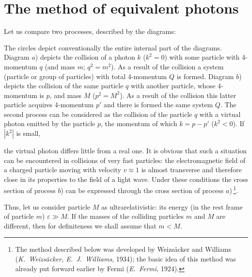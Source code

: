 
\section{The method of equivalent photons}


Let us compare two processes, described by the diagrams:


The circles depict conventionally the entire internal part of the diagrams. Diagram $a$) depicts the collision of a photon $k$ ($k^2 = 0$) with some particle with 4-momentum $q$ (and mass $m$; $q^2 = m^2$). As a result of the collision a system (particle or group of particles) with total 4-momentum $Q$ is formed. Diagram $b$) depicts the collision of the same particle $q$ with another particle, whose 4-momentum is $p$, and mass $M$ ($p^2 = M^2$). As a result of the collision this latter particle acquires 4-momentum $p'$ and there is formed the same system $Q$. The second process can be considered as the collision of the particle $q$ with a virtual photon emitted by the particle $p$, the momentum of which $k = p - p'$ ($k^2 < 0$). If $|k^2|$ is small,


the virtual photon differs little from a real one. It is obvious that such a situation can be encountered in collisions of very fast particles: the electromagnetic field of a charged particle moving with velocity $v \approx 1$ is almost transverse and therefore close in its properties to the field of a light wave. Under these conditions the cross section of process $b$) can be expressed through the cross section of process $a$)\,\footnote{The method described below was developed by Weizs\"{a}cker and Williams (\emph{K.~Weizs\"{a}cker, E.~J.~Williams}, 1934); the basic idea of this method was already put forward earlier by Fermi (\emph{E.~Fermi}, 1924).}.

Thus, let us consider particle $M$ as ultrarelativistic: its energy (in the rest frame of particle $m$) $\varepsilon \gg M$. If the masses of the colliding particles $m$ and $M$ are different, then for definiteness we shall assume that $m < M$.

